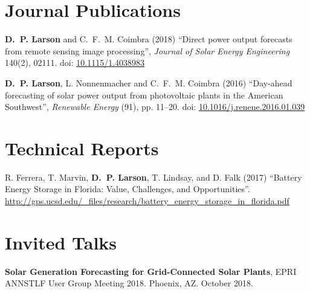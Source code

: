 \documentclass[10pt]{res}
\begin{document}
\begin{resume}
\section{Journal Publications}
\vspace{0.1in}



\textbf{D.~P. Larson} and C.~F.~M. Coimbra (2018) ``Direct power output forecasts from remote sensing image processing'', \textit{Journal of Solar Energy Engineering} 140(2), 02111. doi: \href{http://dx.doi.org/10.1115/1.4038983}{10.1115/1.4038983}

\textbf{D.~P. Larson}, L. Nonnenmacher and C.~F.~M. Coimbra (2016) ``Day-ahead forecasting of solar power output from photovoltaic plants in the American Southwest'', \textit{Renewable Energy} (91), pp. 11--20. doi: \href{http://dx.doi.org/10.1016/j.renene.2016.01.039}{10.1016/j.renene.2016.01.039}


%
\section{Technical Reports}
\vspace{0.1in}

R. Ferrera, T. Marvin, \textbf{D.~P. Larson}, T. Lindsay, and D. Falk (2017) ``Battery Energy Storage in Florida: Value, Challenges, and Opportunities''. \url{http://gps.ucsd.edu/_files/research/battery_energy_storage_in_florida.pdf}


\section{Invited Talks}
\vspace{0.1in}

\textbf{Solar Generation Forecasting for Grid-Connected Solar Plants}, EPRI ANNSTLF User Group Meeting 2018. Phoenix, AZ. October 2018.



\end{resume}
\end{document}
